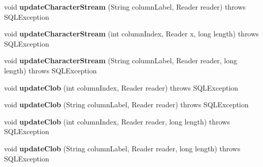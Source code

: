\begin{DoxyCompactItemize}
\item 
\mbox{\label{classcom_1_1mysql_1_1jdbc_1_1_j_d_b_c4_result_set_ad45ef730d81191da3d0a3250e34a2c3f}} 
void {\bfseries update\+Character\+Stream} (String column\+Label, Reader reader)  throws S\+Q\+L\+Exception 
\item 
\mbox{\label{classcom_1_1mysql_1_1jdbc_1_1_j_d_b_c4_result_set_a9f89802e78fb3e0280ffb9c47d9cca8a}} 
void {\bfseries update\+Character\+Stream} (int column\+Index, Reader x, long length)  throws S\+Q\+L\+Exception 
\item 
\mbox{\label{classcom_1_1mysql_1_1jdbc_1_1_j_d_b_c4_result_set_a07626d8b8f1995baf65ac7e15989faab}} 
void {\bfseries update\+Character\+Stream} (String column\+Label, Reader reader, long length)  throws S\+Q\+L\+Exception 
\item 
\mbox{\label{classcom_1_1mysql_1_1jdbc_1_1_j_d_b_c4_result_set_a6131c301b1fa7a000bb458da1ff87349}} 
void {\bfseries update\+Clob} (int column\+Index, Reader reader)  throws S\+Q\+L\+Exception 
\item 
\mbox{\label{classcom_1_1mysql_1_1jdbc_1_1_j_d_b_c4_result_set_a938b87a97b2dc363d8c83c6f93e30bc5}} 
void {\bfseries update\+Clob} (String column\+Label, Reader reader)  throws S\+Q\+L\+Exception 
\item 
\mbox{\label{classcom_1_1mysql_1_1jdbc_1_1_j_d_b_c4_result_set_aba0260401b02de5e996b6950d7e6e311}} 
void {\bfseries update\+Clob} (int column\+Index, Reader reader, long length)  throws S\+Q\+L\+Exception 
\item 
\mbox{\label{classcom_1_1mysql_1_1jdbc_1_1_j_d_b_c4_result_set_aa85c62419f26963772cc1081a9801962}} 
void {\bfseries update\+Clob} (String column\+Label, Reader reader, long length)  throws S\+Q\+L\+Exception 
\item 
\mbox{\label{classcom_1_1mysql_1_1jdbc_1_1_j_d_b_c4_result_set_add52ce217134df0f3105214475312972}} 

\end{DoxyCompactItemize}
